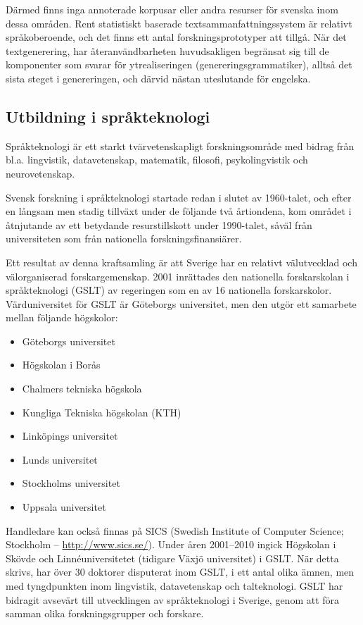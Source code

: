 \begin{multicols}{2}
Därmed finns inga annoterade
korpusar eller andra resurser för svenska inom dessa områden. Rent
statistiskt baserade textsammanfattningssystem är relativt
språk\-obe\-ro\-en\-de, och det finns ett antal forskningsprototyper att
tillgå. När det textgenerering, har återanvändbarheten huvudsakligen
begränsat sig till de komponenter som svarar för ytrealiseringen
(genereringsgrammatiker), alltså det sista steget i genereringen, och
därvid nästan uteslutande för engelska.


\subsection{Utbildning i språkteknologi}

Språkteknologi är ett starkt tvärvetenskapligt forskningsområde med
bidrag från bl.a. lingvistik, datavetenskap, matematik, filosofi,
psykolingvistik och neurovetenskap. 

Svensk forskning i språkteknologi
startade redan i slutet av 1960-talet, och efter en långsam men stadig
tillväxt under de följande två årtiondena, kom området i åtnjutande av
ett betydande resurstillskott under 1990-talet, såväl från
universiteten som från nationella forskningsfinansiärer. 

Ett resultat
av denna kraftsamling är att Sverige har en relativt välutvecklad och
välorganiserad forskargemenskap. 2001 inrättades den nationella
forskarskolan i språkteknologi (GSLT) av regeringen som en av 16
nationella forskarskolor. Värd\-uni\-ver\-si\-tet för GSLT är Göteborgs
universitet, men den utgör ett samarbete mellan följande högskolor:

\begin{itemize}
\item Göteborgs universitet
\item Högskolan i Borås
\item Chalmers tekniska högskola
\item Kungliga Tekniska högskolan (KTH)
\item Linköpings universitet
\item Lunds universitet
\item Stockholms universitet
\item Uppsala universitet
\end{itemize}

Handledare kan också finnas på SICS (Swedish Institute of Computer
Science; Stockholm -- \url{http://www.sics.se/}). Under åren
2001--2010 ingick Högskolan i Skövde och Linnéuniversitetet (tidigare
Växjö universitet) i GSLT. När detta skrivs, har över 30 doktorer
disputerat inom GSLT, i ett antal olika ämnen, men med tyngdpunkten
inom lingvistik, datavetenskap och talteknologi. GSLT har bidragit
avsevärt till utvecklingen av språkteknologi i Sverige, genom att föra
samman olika forskningsgrupper och forskare. 


\end{multicols}
